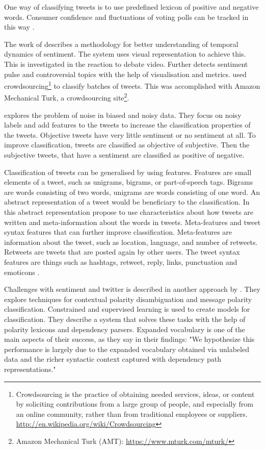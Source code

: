 One way of classifying tweets is to use predefined lexicon of positive and
negative words. Consumer confidence and fluctuations of voting polls can be
tracked in this way \cite[]{connor2010}.

The work of \cite[]{diakopoulos2010} describes a methodology for better
understanding of temporal dynamics of sentiment. 
The system uses visual representation to achieve this. 
This is investigated in the reaction to debate video.
	Further \cite[]{diakopoulos2010} detects sentiment pulse and controversial
topics with the help of visualisation and metrics. 
	\cite[]{diakopoulos2010} used crowdsourcing\footnote{Crowdsourcing is the
practice of obtaining needed services, ideas, or content by soliciting
contributions from a large group of people, and especially from an online
community, rather than from traditional employees or suppliers.
\url{http://en.wikipedia.org/wiki/Crowdsourcing}} to classify batches of tweets.
This was accomplished with Amazon Mechanical Turk, a crowdsourcing
site\footnote{Amazon Mechanical Turk (AMT): \url{https://www.mturk.com/mturk/}}.

\cite[]{barbosa10} explores the problem of noise in biased and noisy data. 
They focus on noisy labels and add features to the tweets to increase the
classification properties of the tweets. Objective tweets have very little
sentiment or no sentiment at all. To improve classification, tweets are
classified as objective of subjective. Then the subjective tweets, that have a
sentiment are classified as positive of negative. 

Classification of tweets can be generalised by using features. Features are
small elements of a tweet, such as unigrams, bigrams, or part-of-speech tags.
Bigrams are words consisting of two words, unigrams are words consisting of one
word. An abstract representation of a tweet would be beneficiary to the
classification. In this abstract representation \cite[]{barbosa10} propose to
use characteristics about how tweets are written and meta-information about the
words in tweets.  Meta-features and tweet syntax features that can further improve
classification. Meta-features are information about the tweet, such as location,
language, and number of retweets. Retweets are tweets that are posted again by other users. The tweet syntax features are things such as hashtags, retweet,
reply, links, punctuation and emoticons \cite[]{barbosa10}. 

Challenges with sentiment and twitter is described in another approach by 
\cite[]{becker13}. They explore techniques for contextual polarity
disambiguation and message polarity classification. Constrained and supervised
learning is used to create models for classification. They describe a system
that solves these tasks with the help of polarity lexicons and dependency
parsers. Expanded vocabulary is one of the main aspects of their success, as
they say in their findings: "We hypothesize this performance is largely due to
the expanded vocabulary obtained via unlabeled data and the richer syntactic
context captured with dependency path representations." \cite[]{becker13}

